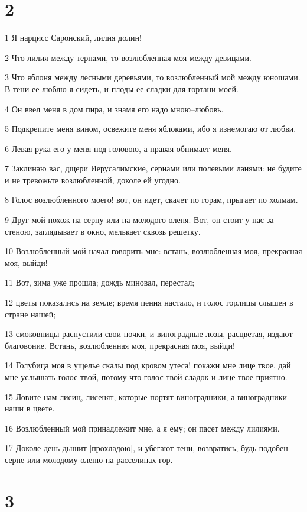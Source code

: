 \chapter{2}

\par 1 Я нарцисс Саронский, лилия долин!
\par 2 Что лилия между тернами, то возлюбленная моя между девицами.
\par 3 Что яблоня между лесными деревьями, то возлюбленный мой между юношами. В тени ее люблю я сидеть, и плоды ее сладки для гортани моей.
\par 4 Он ввел меня в дом пира, и знамя его надо мною--любовь.
\par 5 Подкрепите меня вином, освежите меня яблоками, ибо я изнемогаю от любви.
\par 6 Левая рука его у меня под головою, а правая обнимает меня.
\par 7 Заклинаю вас, дщери Иерусалимские, сернами или полевыми ланями: не будите и не тревожьте возлюбленной, доколе ей угодно.
\par 8 Голос возлюбленного моего! вот, он идет, скачет по горам, прыгает по холмам.
\par 9 Друг мой похож на серну или на молодого оленя. Вот, он стоит у нас за стеною, заглядывает в окно, мелькает сквозь решетку.
\par 10 Возлюбленный мой начал говорить мне: встань, возлюбленная моя, прекрасная моя, выйди!
\par 11 Вот, зима уже прошла; дождь миновал, перестал;
\par 12 цветы показались на земле; время пения настало, и голос горлицы слышен в стране нашей;
\par 13 смоковницы распустили свои почки, и виноградные лозы, расцветая, издают благовоние. Встань, возлюбленная моя, прекрасная моя, выйди!
\par 14 Голубица моя в ущелье скалы под кровом утеса! покажи мне лице твое, дай мне услышать голос твой, потому что голос твой сладок и лице твое приятно.
\par 15 Ловите нам лисиц, лисенят, которые портят виноградники, а виноградники наши в цвете.
\par 16 Возлюбленный мой принадлежит мне, а я ему; он пасет между лилиями.
\par 17 Доколе день дышит [прохладою], и убегают тени, возвратись, будь подобен серне или молодому оленю на расселинах гор.

\chapter{3}

